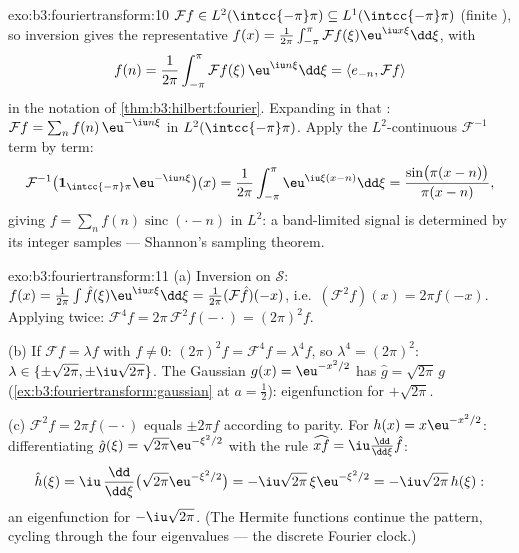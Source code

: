 \begin{solution}{exo:b3:fouriertransform:10}
$\mathcal Ff \in L^2(\intcc{-\pi}\pi) \subseteq
L^1(\intcc{-\pi}\pi)$ (finite ), so inversion gives the
 representative $f(x) =
\frac1{2\pi}\int_{-\pi}^\pi\mathcal Ff(\xi)\eu^{\iu
x\xi}\dd\xi$, with
\[
f(n) = \frac1{2\pi}\int_{-\pi}^{\pi}\mathcal
Ff(\xi)\,\eu^{\iu n\xi}\dd\xi = \langle e_{-n}, \mathcal
Ff\rangle
\]
in the notation of \cref{thm:b3:hilbert:fourier}. Expanding in
that : $\mathcal Ff = \sum_nf(n)\,\eu^{-\iu
n\xi}$ in $L^2(\intcc{-\pi}\pi)$. Apply the
$L^2$-continuous $\mathcal F^{-1}$ term by term:
\[
\mathcal F^{-1}\bigl(\mathbf
1_{\intcc{-\pi}\pi}\eu^{-\iu n\xi}\bigr)(x)
= \frac1{2\pi}\int_{-\pi}^{\pi}\eu^{\iu\xi(x - n)}\dd\xi
= \frac{\sin\bigl(\pi(x-n)\bigr)}{\pi(x - n)} ,
\]
giving $f = \sum_nf(n)\operatorname{sinc}(\cdot - n)$ in
$L^2$: a band-limited signal is determined by its integer
samples --- Shannon's sampling theorem.
\end{solution}

\begin{solution}{exo:b3:fouriertransform:11}
(a) Inversion on $\mathcal S$: $f(x) =
\frac1{2\pi}\int\hat f(\xi)\eu^{\iu x\xi}\dd\xi =
\frac1{2\pi}(\mathcal F\hat f)(-x)$, i.e.\ $(\mathcal
F^2f)(x) = 2\pi f(-x)$. Applying twice: $\mathcal F^4f =
2\pi\,\mathcal F^2f(-\cdot) = (2\pi)^2f$.

(b) If $\mathcal Ff = \lambda f$ with $f \neq 0$:
$(2\pi)^2f = \mathcal F^4f = \lambda^4f$, so $\lambda^4 =
(2\pi)^2$: $\lambda \in \{\pm\sqrt{2\pi},
\pm\iu\sqrt{2\pi}\}$. The Gaussian $g(x) = \eu^{-x^2/2}$ has
$\hat g = \sqrt{2\pi}\,g$
(\cref{ex:b3:fouriertransform:gaussian} at $a = \frac12$):
eigenfunction for $+\sqrt{2\pi}$.

(c) $\mathcal F^2f = 2\pi f(-\cdot)$ equals $\pm2\pi f$
according to parity. For $h(x) = x\eu^{-x^2/2}$:
differentiating $\hat g(\xi) = \sqrt{2\pi}\eu^{-\xi^2/2}$
with the rule $\widehat{xf} = \iu\frac{\dd}{\dd\xi}\hat f$:
\[
\hat h(\xi) = \iu\,\frac{\dd}{\dd\xi}\bigl(\sqrt{2\pi}
\eu^{-\xi^2/2}\bigr) = -\iu\sqrt{2\pi}\,\xi\eu^{-\xi^2/2}
= -\iu\sqrt{2\pi}\,h(\xi) :
\]
an eigenfunction for $-\iu\sqrt{2\pi}$. (The Hermite
functions continue the pattern, cycling through the four
eigenvalues --- the discrete Fourier clock.)

\end{solution}

